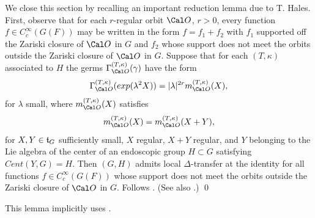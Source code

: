 We close this section by recalling an important reduction lemma
due to T. Hales. First, observe that for each $r$-regular
orbit ${\Cal O}$, $r>0$,
every function $f\in C_c^\infty(G(F))$ may be written in the form $f=f_1+f_2$
with $f_1$ supported off the Zariski closure of ${\Cal O}$ in $G$
and $f_2$ whose support does not meet the orbits outside the 
Zariski closure of ${\Cal O}$ in $G$.
 Suppose that for each $(T,\kappa)$ 
associated to $H$ 
the germs $\Gamma_{{\Cal O}}^{(T,\kappa)}(\gamma)$ have the form
$$
\Gamma_{{\Cal O}}^{(T,\kappa)}(exp(\lambda^2 X))=
|\lambda|^{2r}m_{{\Cal O}}^{(T,\kappa)}(X),
$$
for $\lambda$ small, where $m_{{\Cal O}}^{(T,\kappa)}(X)$ satisfies
$$
m_{{\Cal O}}^{(T,\kappa)}(X)=m_{{\Cal O}}^{(T,\kappa)}(X+Y),
$$
for $X,Y\in {\frak t}_G$ sufficiently small, $X$ regular,
$X+Y$ regular, and $Y$ belonging to the Lie algebra of the center
of an endoscopic group $H\subset G$ satisfying $Cent(Y,G)=H$. 
Then $(G,H)$ admits local
$\Delta$-transfer at the identity for all functions $f\in C_c^\infty(G(F))$
whose support does not meet the orbits outside the 
Zariski closure of ${\Cal O}$ in $G$. 
\endproclaim
{} Follows \cite{H3, Lemma 6.1}. (See also \cite{H2, Proposition 
2.11}.)  \qed
\enddemo

This lemma implicitly uses \cite{LS2}.
\enddocument

